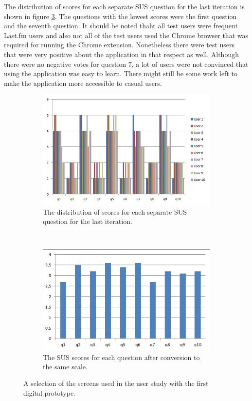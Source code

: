 The distribution of scores for each separate SUS question for the last iteration is shown in figure \ref{figure:sus_scores_iteration4}. The questions with the lowest scores were the first question and the seventh question. It should be noted thaht all test users were frequent Last.fm users and also not all of the test users used the Chrome browser that was required for running the Chrome extension. Nonetheless there were test users that were very positive about the application in that respect as well. Although there were no negative votes for question 7, a lot of users were not convinced that using the application was easy to learn. There might still be some work left to make the application more accessible to casual users.

\begin{figure}
	\centering
	\begin{subfigure}[b]{0.5\textwidth}
					\centering
					\includegraphics[width=\textwidth]{img/sus_question_distribution}%
					\caption{The distribution of scores for each separate SUS question for the last iteration.}
					\label{figure:it4_sus_question_distribution}
	\end{subfigure}%
	~
	\begin{subfigure}[b]{0.5\textwidth}
					\centering
					\includegraphics[width=\textwidth]{img/sus_question_scores}
					\caption{The SUS scores for each question after conversion to the same scale.}
					\label{figure:it4_sus_question_score}
	\end{subfigure}
	\caption{A selection of the screens used in the user study with the first digital prototype.}%
	\label{figure:sus_scores_iteration4}%
\end{figure}



